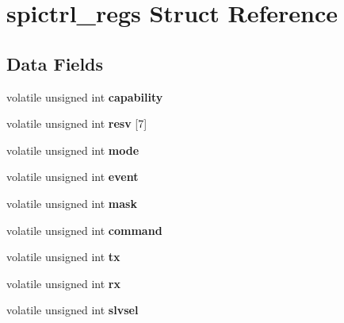 \hypertarget{structspictrl__regs}{}\section{spictrl\+\_\+regs Struct Reference}
\label{structspictrl__regs}
\subsection*{Data Fields}
\begin{DoxyCompactItemize}
\item 
\mbox{\label{structspictrl__regs_a13d784723f3fc0d5355aa1b556c0136a}} 
volatile unsigned int {\bfseries capability}
\item 
\mbox{\label{structspictrl__regs_a0b13046723c0112ceef0bdf31455f4a8}} 
volatile unsigned int {\bfseries resv} \mbox{[}7\mbox{]}
\item 
\mbox{\label{structspictrl__regs_ad973e8fd528b885beb1163ee6580c27c}} 
volatile unsigned int {\bfseries mode}
\item 
\mbox{\label{structspictrl__regs_ac7a3890b170d03953bf48f7bd122f0ab}} 
volatile unsigned int {\bfseries event}
\item 
\mbox{\label{structspictrl__regs_a04943d90b2c36e8caa0cfe5dc38df44d}} 
volatile unsigned int {\bfseries mask}
\item 
\mbox{\label{structspictrl__regs_a5527a09418799bde46d1639fecda9060}} 
volatile unsigned int {\bfseries command}
\item 
\mbox{\label{structspictrl__regs_a56341a9d4a3c3ed265ce0042940c9eba}} 
volatile unsigned int {\bfseries tx}
\item 
\mbox{\label{structspictrl__regs_aa066e372666e3851acb8684f8fc9fe83}} 
volatile unsigned int {\bfseries rx}
\item 
\mbox{\label{structspictrl__regs_a943eb7172944b3341df612e6bd6df89f}} 
volatile unsigned int {\bfseries slvsel}
\item 

\end{DoxyCompactItemize}
